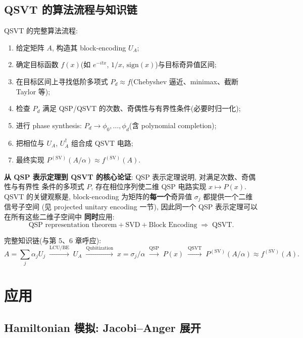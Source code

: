 \documentclass[utf8]{article} %
\numberwithin{equation}{section}   %
\begin{document}
\subsection{QSVT 的算法流程与知识链}

QSVT 的完整算法流程:
\begin{enumerate}
    \item 给定矩阵 $A$, 构造其 block-encoding $U_A$;
    \item 确定目标函数 $f(x)$(如 $e^{-itx}$, $1/x$, $\mathrm{sign}(x)$)与目标奇异值区间;
    \item 在目标区间上寻找低阶多项式 $P_d \approx f$(Chebyshev 逼近、minimax、截断 Taylor 等);
    \item 检查 $P_d$ 满足 QSP/QSVT 的次数、奇偶性与有界性条件(必要时归一化);
    \item 进行 phase synthesis: $P_d \to \phi_0, \dots, \phi_d$(含 polynomial completion);
    \item 把相位与 $U_A$, $U_A^\dagger$ 组合成 QSVT 电路;
    \item 最终实现 $P^{(\mathrm{SV})}(A/\alpha) \approx f^{(\mathrm{SV})}(A)$.
\end{enumerate}

\textbf{从 QSP 表示定理到 QSVT 的核心论证}: QSP 表示定理说明, 对满足次数、奇偶性与有界性
条件的多项式 $P$, 存在相位序列使二维 QSP 电路实现 $x \mapsto P(x)$. QSVT 的关键观察是,
block-encoding 为矩阵的\textbf{每一个}奇异值 $\sigma_j$ 都提供一个二维信号子空间
(见 projected unitary encoding 一节), 因此同一个 QSP 表示定理可以在所有这些二维子空间中
\textbf{同时}应用:
\begin{equation}
    \text{QSP representation theorem} + \text{SVD} + \text{Block Encoding}
    \;\Longrightarrow\; \text{QSVT}.
\end{equation}

完整知识链(与第 5、6 章呼应):
\begin{equation}
    A = \sum_j \alpha_j U_j
    \;\xrightarrow{\text{LCU/BE}}\; U_A
    \;\xrightarrow{\text{Qubitization}}\; x = \sigma_j/\alpha
    \;\xrightarrow{\text{QSP}}\; P(x)
    \;\xrightarrow{\text{QSVT}}\; P^{(\mathrm{SV})}(A/\alpha) \approx f^{(\mathrm{SV})}(A).
\end{equation}

\section{应用}

\subsection{Hamiltonian 模拟: Jacobi--Anger 展开}
\end{document}
